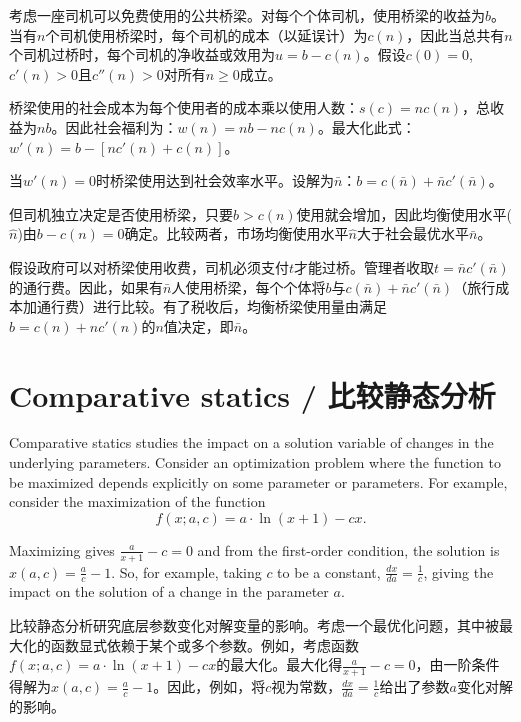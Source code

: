 \begin{translation}
考虑一座司机可以免费使用的公共桥梁。对每个个体司机，使用桥梁的收益为$b$。当有$n$个司机使用桥梁时，每个司机的成本（以延误计）为$c(n)$，因此当总共有$n$个司机过桥时，每个司机的净收益或效用为$u = b - c(n)$。假设$c(0) = 0$, $c'(n) > 0$且$c''(n) > 0$对所有$n \ge 0$成立。

桥梁使用的社会成本为每个使用者的成本乘以使用人数：$s(c) = n c(n)$，总收益为$n b$。因此社会福利为：$w(n) = n b - n c(n)$。最大化此式：$w'(n) = b - [n c'(n) + c(n)]$。

当$w'(n) = 0$时桥梁使用达到社会效率水平。设解为$\bar{n}$：$b = c(\bar{n}) + \bar{n} c'(\bar{n})$。

但司机独立决定是否使用桥梁，只要$b > c(n)$使用就会增加，因此均衡使用水平($\hat{n}$)由$b - c(n) = 0$确定。比较两者，市场均衡使用水平$\hat{n}$大于社会最优水平$\bar{n}$。

假设政府可以对桥梁使用收费，司机必须支付$t$才能过桥。管理者收取$t = \bar{n} c'(\bar{n})$的通行费。因此，如果有$\bar{n}$人使用桥梁，每个个体将$b$与$c(\bar{n}) + \bar{n} c'(\bar{n})$（旅行成本加通行费）进行比较。有了税收后，均衡桥梁使用量由满足$b = c(n) + n c'(n)$的$n$值决定，即$\bar{n}$。
\end{translation}

\section{Comparative statics / 比较静态分析}

\begin{original}
Comparative statics studies the impact on a solution variable of changes in the underlying parameters. Consider an optimization problem where the function to be maximized depends explicitly on some parameter or parameters. For example, consider the maximization of the function
\[
f(x; a, c) = a \cdot \ln(x + 1) - c x.
\]

Maximizing gives $\frac{a}{x+1} - c = 0$ and from the first-order condition, the solution is $x(a, c) = \frac{a}{c} - 1$. So, for example, taking $c$ to be a constant, $\frac{dx}{da} = \frac{1}{c}$, giving the impact on the solution of a change in the parameter $a$.
\end{original}
\begin{translation}
比较静态分析研究底层参数变化对解变量的影响。考虑一个最优化问题，其中被最大化的函数显式依赖于某个或多个参数。例如，考虑函数$f(x; a, c) = a \cdot \ln(x + 1) - c x$的最大化。最大化得$\frac{a}{x+1} - c = 0$，由一阶条件得解为$x(a, c) = \frac{a}{c} - 1$。因此，例如，将$c$视为常数，$\frac{dx}{da} = \frac{1}{c}$给出了参数$a$变化对解的影响。
\end{translation}

